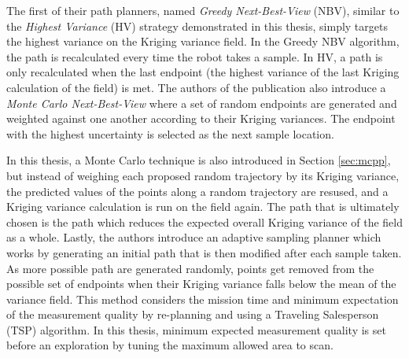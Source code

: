 The first of their path planners, named \textit{Greedy Next-Best-View} (NBV), similar to the \textit{Highest Variance} (HV) strategy demonstrated in this thesis, simply targets the highest variance on the Kriging variance field. In the Greedy NBV algorithm, the path is recalculated every time the robot takes a sample. In HV, a path is only recalculated when the last endpoint (the highest variance of the last Kriging calculation of the field) is met. The authors of the publication also introduce a \textit{Monte Carlo Next-Best-View} where a set of random endpoints are generated and weighted against one another according to their Kriging variances. The endpoint with the highest uncertainty is selected as the next sample location. 

In this thesis, a Monte Carlo technique is also introduced in Section \ref{sec:mcpp}, but instead of weighing each proposed random trajectory by its Kriging variance, the predicted values of the points along a random trajectory are resused, and a Kriging variance calculation is run on the field again. The path that is ultimately chosen is the path which reduces the expected overall Kriging variance of the field as a whole. Lastly, the authors introduce an adaptive sampling planner which works by generating an initial path that is then modified after each sample taken. As more possible path are generated randomly, points get removed from the possible set of endpoints when their Kriging variance falls below the mean of the variance field. This method considers the mission time and minimum expectation of the measurement quality by re-planning and using a Traveling Salesperson (TSP) algorithm. In this thesis, minimum expected measurement quality is set before an exploration by tuning the maximum allowed area to scan.